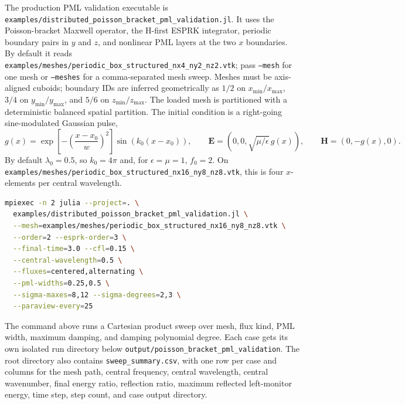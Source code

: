 \documentclass[11pt,oneside]{book}
\newcommand{\code}[1]{\texttt{#1}}
\newcommand{\vect}[1]{\boldsymbol{#1}}
\begin{document}
The production PML validation executable is
\code{examples/distributed\_poisson\_bracket\_pml\_validation.jl}. It uses
the Poisson-bracket Maxwell operator, the H-first ESPRK integrator, periodic
boundary pairs in $y$ and $z$, and nonlinear PML layers at the two $x$
boundaries. By default it reads
\code{examples/meshes/periodic\_box\_structured\_nx4\_ny2\_nz2.vtk}; pass
\code{--mesh} for one mesh or \code{--meshes} for a comma-separated mesh
sweep. Meshes must be axis-aligned cuboids; boundary IDs are inferred
geometrically as $1/2$ on $x_{\min}/x_{\max}$, $3/4$ on
$y_{\min}/y_{\max}$, and $5/6$ on $z_{\min}/z_{\max}$. The loaded mesh is
partitioned with a deterministic balanced spatial partition. The initial
condition is a right-going sine-modulated Gaussian pulse,
\[
  g(x)=
  \exp\left[-\left(\frac{x-x_0}{w}\right)^2\right]
  \sin\left(k_0(x-x_0)\right),
  \qquad
  \vect E=(0,0,\sqrt{\mu/\epsilon}\,g(x)),\qquad
  \vect H=(0,-g(x),0).
\]
By default $\lambda_0=0.5$, so $k_0=4\pi$ and, for
$\epsilon=\mu=1$, $f_0=2$. On
\code{examples/meshes/periodic\_box\_structured\_nx16\_ny8\_nz8.vtk}, this is
four $x$-elements per central wavelength.

\begin{lstlisting}[language=bash]
mpiexec -n 2 julia --project=. \
  examples/distributed_poisson_bracket_pml_validation.jl \
  --mesh=examples/meshes/periodic_box_structured_nx16_ny8_nz8.vtk \
  --order=2 --esprk-order=3 \
  --final-time=3.0 --cfl=0.15 \
  --central-wavelength=0.5 \
  --fluxes=centered,alternating \
  --pml-widths=0.25,0.5 \
  --sigma-maxes=8,12 --sigma-degrees=2,3 \
  --paraview-every=25
\end{lstlisting}

The command above runs a Cartesian product sweep over mesh, flux kind, PML
width, maximum damping, and damping polynomial degree. Each case gets its own
isolated run directory below
\code{output/poisson\_bracket\_pml\_validation}. The root directory also
contains \code{sweep\_summary.csv}, with one row per case and columns for the
mesh path, central frequency, central wavelength, central wavenumber, final
energy ratio, reflection ratio, maximum reflected left-monitor energy, time
step, step count, and case output directory.
\end{document}
